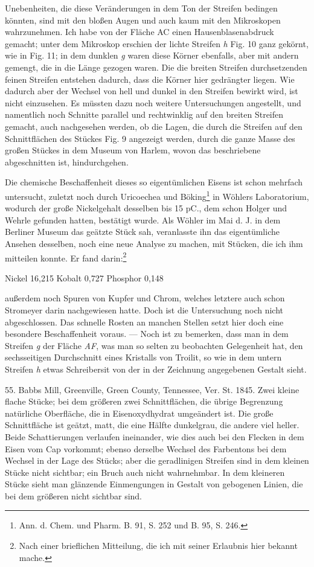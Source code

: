 \documentclass[a4paper, 11pt, oneside]{article}
\begin{document}
Unebenheiten, die diese Veränderungen in dem Ton der Streifen bedingen könnten, sind mit den bloßen Augen und auch kaum mit den Mikroskopen wahrzunehmen. Ich habe von der Fläche AC einen Hausenblasenabdruck gemacht; unter dem Mikroskop erschien der lichte Streifen \emph{h} Fig. 10 ganz gekörnt, wie in Fig. 11; in dem dunklen \emph{g} waren diese Körner ebenfalls, aber mit andern gemengt, die in die Länge gezogen waren. Die die breiten Streifen durchsetzenden feinen Streifen entstehen dadurch, dass die Körner hier gedrängter liegen. Wie dadurch aber der Wechsel von hell und dunkel in den Streifen bewirkt wird, ist nicht einzusehen. Es müssten dazu noch weitere Untersuchungen angestellt, und namentlich noch Schnitte parallel und rechtwinklig auf den breiten Streifen gemacht, auch nachgesehen werden, ob die Lagen, die durch die Streifen auf den Schnittflächen des Stückes Fig. 9 angezeigt werden, durch die ganze Masse des großen Stückes in dem Museum von Harlem, wovon das beschriebene abgeschnitten ist, hindurchgehen.

Die chemische Beschaffenheit dieses so eigentümlichen Eisens ist schon mehrfach untersucht, zuletzt noch durch Uricoechea und Böking\footnote{Ann. d. Chem. und Pharm. B. 91, S. 252 und B. 95, S. 246.} in Wöhlers Laboratorium, wodurch der große Nickelgehalt desselben bis 15 pC., dem schon Holger und Wehrle gefunden hatten, bestätigt wurde. Als Wöhler im Mai d. J. in dem Berliner Museum das geätzte Stück sah, veranlasste ihn das eigentümliche Ansehen desselben, noch eine neue Analyse zu machen, mit Stücken, die ich ihm mitteilen konnte. Er fand darin:\footnote{Nach einer brieflichen Mitteilung, die ich mit seiner Erlaubnis hier bekannt mache.}

Nickel 16,215  
Kobalt 0,727  
Phosphor 0,148  

außerdem noch Spuren von Kupfer und Chrom, welches letztere auch schon Stromeyer darin nachgewiesen hatte. Doch ist die Untersuchung noch nicht abgeschlossen. Das schnelle Rosten an manchen Stellen setzt hier doch eine besondere Beschaffenheit voraus. — Noch ist zu bemerken, dass man in dem Streifen \emph{g} der Fläche \emph{AF}, was man so selten zu beobachten Gelegenheit hat, den sechsseitigen Durchschnitt eines Kristalls von Troilit, so wie in dem untern Streifen \emph{h} etwas Schreibersit von der in der Zeichnung angegebenen Gestalt sieht.

55. Babbs Mill, Greenville, Green County, Tennessee, Ver. St. 1845. Zwei kleine flache Stücke; bei dem größeren zwei Schnittflächen, die übrige Begrenzung natürliche Oberfläche, die in Eisenoxydhydrat umgeändert ist. Die große Schnittfläche ist geätzt, matt, die eine Hälfte dunkelgrau, die andere viel heller. Beide Schattierungen verlaufen ineinander, wie dies auch bei den Flecken in dem Eisen vom Cap vorkommt; ebenso derselbe Wechsel des Farbentons bei dem Wechsel in der Lage des Stücks; aber die geradlinigen Streifen sind in dem kleinen Stücke nicht sichtbar; ein Bruch auch nicht wahrnehmbar. In dem kleineren Stücke sieht man glänzende Einmengungen in Gestalt von gebogenen Linien, die bei dem größeren nicht sichtbar sind.
\end{document}
